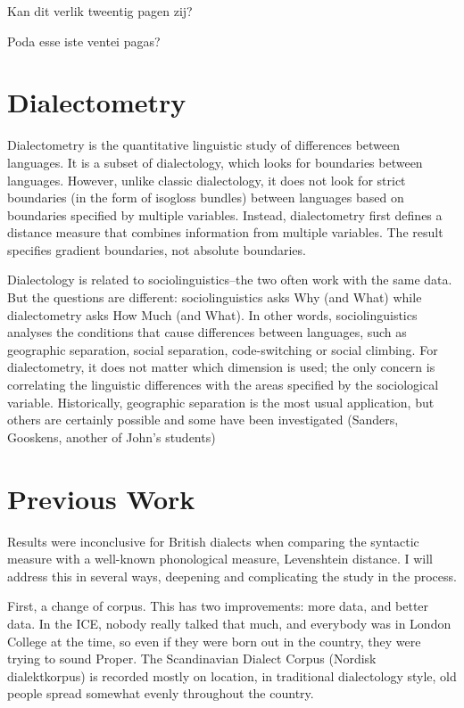 \documentclass[11pt]{article}
\begin{document}
Kan dit verlik tweentig pagen zij?

Poda esse iste ventei pagas?
\section{Dialectometry}

Dialectometry is the quantitative linguistic study of differences
between languages. It is a subset of dialectology, which looks for
boundaries between languages. However, unlike classic dialectology, it
does not look for strict boundaries (in the form of isogloss bundles)
between languages based on boundaries specified by multiple
variables. Instead, dialectometry first defines a distance measure
that combines information from multiple variables. The result
specifies gradient boundaries, not absolute boundaries.

Dialectology is related to sociolinguistics--the two often work with
the same data. But the questions are different: sociolinguistics asks
Why (and What) while dialectometry asks How Much (and What).
In other words, sociolinguistics analyses the conditions that cause
differences between languages, such as geographic separation, social
separation, code-switching or social climbing. For dialectometry, it
does not matter which dimension is used; the only concern is correlating
the linguistic differences with the areas specified by the
sociological variable. Historically, geographic separation is the most
usual application, but others are certainly possible and some have
been investigated (Sanders, Gooskens, another of John's students)

\section{Previous Work}

Results were inconclusive for British dialects when comparing the
syntactic measure with a well-known phonological measure, Levenshtein
distance. I will address this in several ways, deepening and
complicating the study in the process.

First, a change of corpus. This
has two improvements: more data, and better data. In the ICE, nobody
really talked that much, and everybody was in London College at the
time, so even if they were born out in the country, they were trying
to sound Proper. The Scandinavian Dialect Corpus
(Nordisk dialektkorpus) is recorded mostly on location, in traditional
dialectology style, old people spread somewhat evenly throughout the
country.
\end{document}
